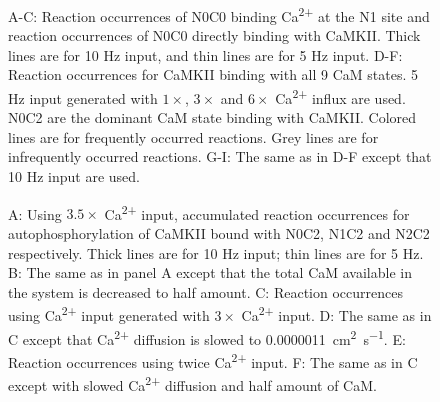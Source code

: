 \documentclass[10pt,letterpaper]{article}
\begin{document}
\begin{comment}
We examined the reaction occurrences profile over time on Layer1 edges (Fig~\ref{fig6}) and noticed that the reaction pathway choice deviates from the predominant pathway when Ca\textsuperscript{2+} level becomes saturating. This trend can be revealed from the pathway choice for CaM N0C2 (Fig~\ref{fig6}A-C). At nonsaturating Ca\textsuperscript{2+} level, N0C2 molecules are more likely to bind with CaMKII (reaction KN0C2) than binding a Ca\textsuperscript{2+} ion on the N1 site (reaction N1). When Ca\textsuperscript{2+} becomes saturating, N0C2 molecules tends to choose N1 binding over reaction KN0C2. This switch of reaction choice is observed for 10 Hz but not for 5 Hz. Likewise, we analyzed the profile of all possible CaMKII-CaM binding reactions. For 5 Hz conditions, binding of N0C2 consistently dominates over other CaMKII-CaM binding reactions, regardless of the amount of Ca\textsuperscript{2+} influx (Fig~\ref{fig6}D-F). However for 10 Hz, as Ca\textsuperscript{2+} influx increases, binding of N2C2 (reaction KN2C2) gradually replaces binding of N0C2 (reaction KN0C2) and becomes the dominant choice for CaM to enter Layer2 (Fig~\ref{fig6}G-I). In breif, this switch of dominant pathway occurs for 10 Hz, correlating with the suboptimal phosphorylation level observed for 10 Hz.
\end{comment}

\begin{figure}[!h]
	\caption{{\bf}
	A-C: Reaction occurrences of N0C0 binding Ca\textsuperscript{2+} at the N1 site and reaction occurrences of N0C0 directly binding with CaMKII. Thick lines are for 10 Hz input, and thin lines are for 5 Hz input. D-F: Reaction occurrences for CaMKII binding with all 9 CaM states. 5 Hz input generated with $1\times$, $3\times$ and $6\times$ Ca\textsuperscript{2+} influx are used. N0C2 are the dominant CaM state binding with CaMKII. Colored lines are for frequently occurred reactions. Grey lines are for infrequently occurred reactions. G-I: The same as in D-F except that 10 Hz input are used. 
	}
\label{fig6}
\end{figure}



\begin{figure}[!h]
	\caption{{\bf}
	A: Using $3.5\times$ Ca\textsuperscript{2+} input, accumulated reaction occurrences for autophosphorylation of CaMKII bound with N0C2, N1C2 and N2C2 respectively. Thick lines are for 10 Hz input; thin lines are for 5 Hz. B: The same as in panel A except that the total CaM available in the system is decreased to half amount. C: Reaction occurrences using Ca\textsuperscript{2+} input generated with $3\times$ Ca\textsuperscript{2+} input. D: The same as in C except that Ca\textsuperscript{2+} diffusion is slowed  to \SI{0.0000011}{\square\cm\per\s}. E: Reaction occurrences using twice Ca\textsuperscript{2+} input. F: The same as in C except with slowed Ca\textsuperscript{2+} diffusion and half amount of CaM.}
\label{fig7}
\end{figure}
\end{document}
